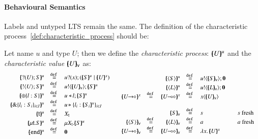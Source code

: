 
\paragraph{Behavioural Semantics}

Labels and untyped LTS remain the same. The definition of the
characteristic process~\ref{def:characteristic_process} should be:
%
\begin{definition}\rm
	\noi Let name $u$ and type $U$; then we define the {\em characteristic process}:
	$[\!\!(U)\!\!]^{u}$ and the {\em characteristic value} $[\!\!(U)\!\!]_{\mathsf{v}}$ as:
%
	\[
	\begin{array}{cc}
		\begin{array}{rclcl}
			\mapchar{\btinp{U} S}{u} &\defeq& \binp{u}{x} (\mapchar{S}{u} \Par \mapchar{U}{x})
			\\
			\mapchar{\btout{U} S}{u} &\defeq& \bout{u}{\omapchar{U}} \mapchar{S}{u} %
			\\
			\mapchar{\btsel{l : S}}{u} &\defeq& \bsel{u}{l} \mapchar{S}{u}
			\\
			\mapchar{\btbra{l_i: S_i}_{i \in I}}{u} &\defeq& \bbra{u}{l_i: \mapchar{S_i}{u}}_{i \in I}
			\\
			\mapchar{\tvar{t}}{u} &\defeq& \varp{X}_{\vart{t}}
			\\
			\mapchar{\trec{t}{S}}{u} &\defeq& \recp{X_{\vart{t}}}{\mapchar{S}{u}}
			\\
			\mapchar{\tinact}{u} &\defeq& \inact
			\\
		\end{array}
		&
		\begin{array}{rcrclcl}
			&&\mapchar{\chtype{S}}{u} &\defeq& \bout{u}{\omapchar{S}} \inact
			\\
			&&\mapchar{\chtype{L}}{u} &\defeq& \bout{u}{\omapchar{L}} \inact
			\\
			\mapchar{\shot{U}}{x} &\defeq& \mapchar{\lhot{U}}{x} &\defeq& \appl{x}{\omapchar{U}}
			\\
			\\
			&&\omapchar{S} &\defeq& s && s \textrm{ fresh}
			\\
			\omapchar{\chtype{S}} &\defeq& \omapchar{\chtype{L}} &\defeq& a && a \textrm{ fresh}
			\\
			\omapchar{\shot{U}} &\defeq& \omapchar{\lhot{U}} &\defeq& \abs{x}{\mapchar{U}{x}}
		\end{array}
	\end{array}
	\]
\end{definition}

